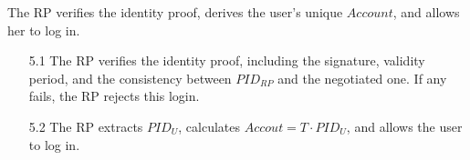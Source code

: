 The RP verifies the identity proof, derives the user's unique $Account$, and allows her to log in.
\vspace{-\topsep}
\begin{itemize}
\item[5.1] The RP verifies the identity proof, including the signature, validity period, and the consistency between $PID_{RP}$ and the negotiated one. If any fails, the RP rejects this login.
\vspace{-\topsep}
\item [5.2] The RP extracts $PID_U$, calculates $Accout = T \cdot {PID_U}$, and allows the user to log in.
\end{itemize}
\vspace{-\topsep}


